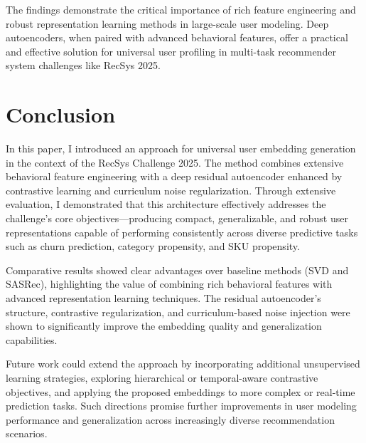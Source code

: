 \documentclass[sigconf]{acmart}
\begin{document}
The findings demonstrate the critical importance of rich feature engineering and robust representation learning methods in large-scale user modeling. Deep autoencoders, when paired with advanced behavioral features, offer a practical and effective solution for universal user profiling in multi-task recommender system challenges like RecSys 2025.
\label{sec:experiments}
\begin{table}[htb!]
\centering
	\caption{Performance comparison (AUROC) across open and hidden tasks.}
	\label{tab:results}
	\end{table}

\section{Conclusion}
In this paper, I introduced an approach for universal user embedding generation in the context of the RecSys Challenge 2025. The method combines extensive behavioral feature engineering with a deep residual autoencoder enhanced by contrastive learning and curriculum noise regularization. Through extensive evaluation, I demonstrated that this architecture effectively addresses the challenge's core objectives—producing compact, generalizable, and robust user representations capable of performing consistently across diverse predictive tasks such as churn prediction, category propensity, and SKU propensity.

Comparative results showed clear advantages over baseline methods (SVD and SASRec), highlighting the value of combining rich behavioral features with advanced representation learning techniques. The residual autoencoder’s structure, contrastive regularization, and curriculum-based noise injection were shown to significantly improve the embedding quality and generalization capabilities.

Future work could extend the approach by incorporating additional unsupervised learning strategies, exploring hierarchical or temporal-aware contrastive objectives, and applying the proposed embeddings to more complex or real-time prediction tasks. Such directions promise further improvements in user modeling performance and generalization across increasingly diverse recommendation scenarios.




\end{document}
